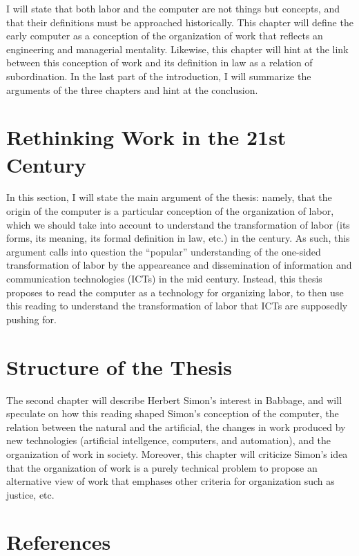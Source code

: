 \documentclass[version=last,draft=false,paper=A4,portrait,twoside=true,twocolumn=true,headinclude=false,footinclude=false,fontsize=12,BCOR=20mm,DIV=13,pagesize=auto,titlepage=firstiscover,mpinclude=false,open=right,chapterprefix=true,numbers=autoendperiod,headsepline=false,parskip=false]{scrbook}
\begin{document}
I will state that both labor and the computer are not things but concepts,
and that their definitions must be approached historically. This chapter
will define the early computer as a conception of the organization of work
that reflects an engineering and managerial mentality. Likewise, this
chapter will hint at the link between this conception of work and its
definition in law as a relation of subordination.
In the last part of the introduction, I will summarize the arguments of the
three chapters and hint at the conclusion. 

\section{Rethinking Work in the 21st Century}
\label{sec:org8deb127}
In this section, I will state the main argument of the thesis: namely, that
the origin of the computer is a particular conception of the organization
of labor, which we should take into account to understand the transformation
of labor (its forms, its meaning, its formal definition in law, etc.) in the
 century. As such, this argument calls into question the ``popular''
understanding of the one-sided transformation of labor by the appeareance
and dissemination of information and communication technologies (ICTs) in
the mid  century. Instead, this thesis proposes to read the
computer as a technology for organizing labor, to then use this reading to
understand the transformation of labor that ICTs are supposedly pushing
for. 

\section{Structure of the Thesis}
\label{sec:org25c77eb}
The second chapter will describe Herbert Simon's interest in Babbage, and
will speculate on how this reading shaped Simon's conception of the
computer, the relation between the natural and the artificial, the changes
in work produced by new technologies (artificial intellgence, computers,
and automation), and the organization of work in society. Moreover, this
chapter will criticize Simon's idea that the organization of work is a
purely technical problem to propose an alternative view of work that
emphases other criteria for organization such as justice, etc.

\section*{References}
\printbibliography[heading=none,keyword=introduction]
\end{document}

